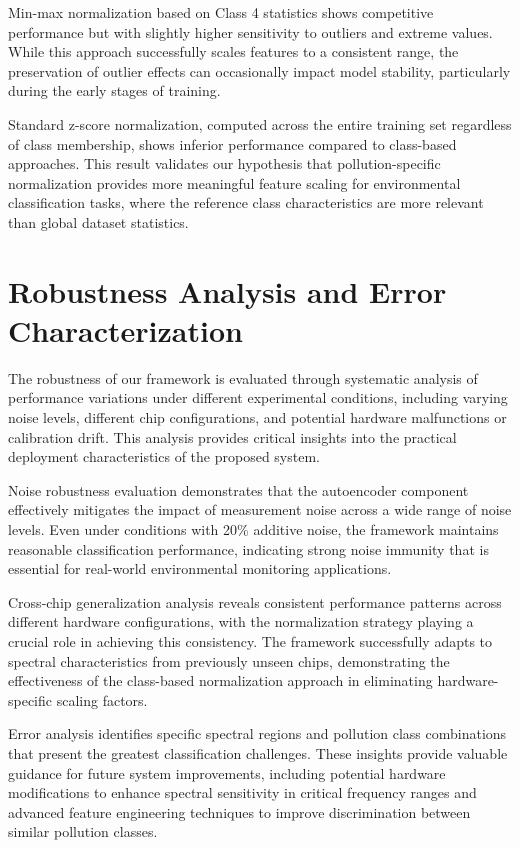 Min-max normalization based on Class 4 statistics shows competitive performance but with slightly higher sensitivity to outliers and extreme values. While this approach successfully scales features to a consistent range, the preservation of outlier effects can occasionally impact model stability, particularly during the early stages of training.

Standard z-score normalization, computed across the entire training set regardless of class membership, shows inferior performance compared to class-based approaches. This result validates our hypothesis that pollution-specific normalization provides more meaningful feature scaling for environmental classification tasks, where the reference class characteristics are more relevant than global dataset statistics.

\section{Robustness Analysis and Error Characterization}
\label{sec:robustness_analysis}

The robustness of our framework is evaluated through systematic analysis of performance variations under different experimental conditions, including varying noise levels, different chip configurations, and potential hardware malfunctions or calibration drift. This analysis provides critical insights into the practical deployment characteristics of the proposed system.

Noise robustness evaluation demonstrates that the autoencoder component effectively mitigates the impact of measurement noise across a wide range of noise levels. Even under conditions with 20\% additive noise, the framework maintains reasonable classification performance, indicating strong noise immunity that is essential for real-world environmental monitoring applications.

Cross-chip generalization analysis reveals consistent performance patterns across different hardware configurations, with the normalization strategy playing a crucial role in achieving this consistency. The framework successfully adapts to spectral characteristics from previously unseen chips, demonstrating the effectiveness of the class-based normalization approach in eliminating hardware-specific scaling factors.

Error analysis identifies specific spectral regions and pollution class combinations that present the greatest classification challenges. These insights provide valuable guidance for future system improvements, including potential hardware modifications to enhance spectral sensitivity in critical frequency ranges and advanced feature engineering techniques to improve discrimination between similar pollution classes.

